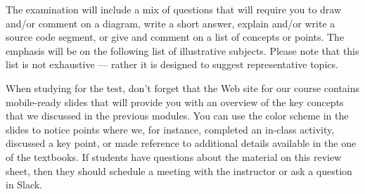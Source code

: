 \documentclass[11pt]{article}
\begin{document}
\noindent The examination will include a mix of questions that will require you
to draw and/or comment on a diagram, write a short answer, explain and/or write
a source code segment, or give and comment on a list of concepts or points. The
emphasis will be on the following list of illustrative subjects. Please note
that this list is not exhaustive --- rather it is designed to suggest
representative topics.

When studying for the test, don't forget that the Web site for our course
contains mobile-ready slides that will provide you with an overview of the key
concepts that we discussed in the previous modules. You can use the color scheme
in the slides to notice points where we, for instance, completed an in-class
activity, discussed a key point, or made reference to additional details
available in the one of the textbooks. If students have questions about the
material on this review sheet, then they should schedule a meeting with the
instructor or ask a question in Slack.
\end{document}
